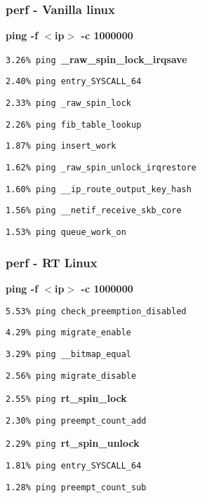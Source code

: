 \begin{frame}
	\frametitle{perf - Vanilla linux}
	\textbf{ping -f $<$ip$>$ -c 1000000}

	\texttt{3.26\%  ping }\textbf{\_raw\_spin\_lock\_irqsave}

\texttt{2.40\%  ping  entry\_SYSCALL\_64}

\texttt{2.33\%  ping  \_raw\_spin\_lock}

\texttt{2.26\%  ping  fib\_table\_lookup}

\texttt{1.87\%  ping  insert\_work}

\texttt{1.62\%  ping  \_raw\_spin\_unlock\_irqrestore}

\texttt{1.60\%  ping  \_\_ip\_route\_output\_key\_hash}

\texttt{1.56\%  ping  \_\_netif\_receive\_skb\_core}

\texttt{1.53\%  ping  queue\_work\_on}
\end{frame}


\begin{frame}
	\frametitle{perf - RT Linux}
	\textbf{ping -f $<$ip$>$ -c 1000000}

\texttt{5.53\%  ping check\_preemption\_disabled}

\texttt{4.29\%  ping migrate\_enable}

\texttt{3.29\%  ping \_\_bitmap\_equal}

\texttt{2.56\%  ping migrate\_disable}

\texttt{2.55\%  ping }\textbf{rt\_spin\_lock}

\texttt{2.30\%  ping preempt\_count\_add}

\texttt{2.29\%  ping }\textbf{rt\_spin\_unlock}

\texttt{1.81\%  ping entry\_SYSCALL\_64}

\texttt{1.28\%  ping preempt\_count\_sub}
\end{frame}


